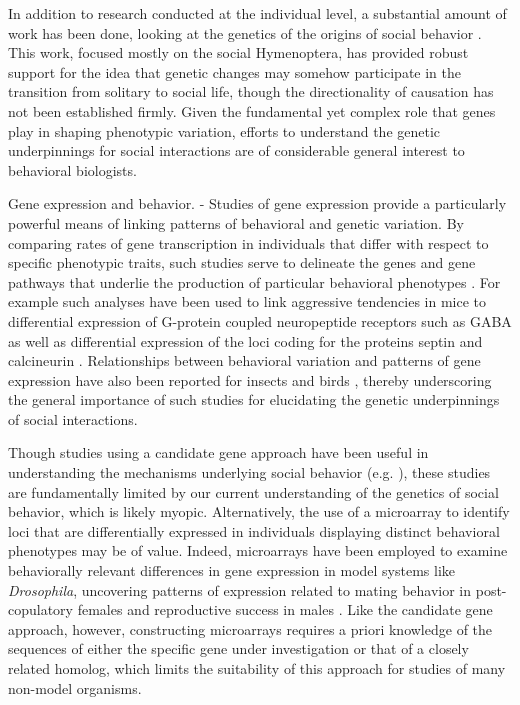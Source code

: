 \documentclass[10.5pt]{article}
\begin{document}
In addition to research conducted at the individual level, a substantial amount of work has been done, looking at the genetics of the origins of social behavior \citep{Robinson:2008gq,Toth:2010fr}. This work, focused mostly on the social Hymenoptera, has provided robust support for the idea that genetic changes may somehow participate in the transition from solitary to social life, though the directionality of causation has not been established firmly. Given the fundamental yet complex role that genes play in shaping phenotypic variation, efforts to understand the genetic underpinnings for social interactions are of considerable general interest to behavioral biologists.

Gene expression and behavior. - Studies of gene expression provide a particularly powerful means of linking patterns of behavioral and genetic variation. By comparing rates of gene transcription in individuals that differ with respect to specific phenotypic traits, such studies serve to delineate the genes and gene pathways that underlie the production of particular behavioral phenotypes \citep{Burmeister:2005jw, Mukai:2009cr}. For example such analyses have been used to link aggressive tendencies in mice to differential expression of G-protein coupled neuropeptide receptors such as GABA \citep{SustkovaFiserova:2009um} as well as differential expression of the loci coding for the proteins septin \citep{Suzuki:2009hf} and calcineurin \citep{Miyakawa:2003gw}. Relationships between behavioral variation and patterns of gene expression have also been reported for insects \citep{Toth:2007cr, Dottorini:2007bc} and birds \citep{Mukai:2009cr, Lovell:2008jz, Wacker:2010gg}, thereby underscoring the general importance of such studies for elucidating the genetic underpinnings of social interactions. 

Though studies using a candidate gene approach have been useful in understanding the mechanisms underlying social behavior (e.g. \citep{Fitzpatrick:2005vd}), these studies are fundamentally limited by our current understanding of the genetics of social behavior, which is likely myopic.   Alternatively, the use of a microarray to identify loci that are differentially expressed in individuals displaying distinct behavioral phenotypes may be of value. Indeed, microarrays have been employed to examine behaviorally relevant differences in gene expression in model systems like \textit{Drosophila}, uncovering patterns of expression related to mating behavior in post-copulatory females \citep{Mack:2006cn, McGraw:2004hg} and reproductive success in males \citep{Drnevich:2004dj}.  Like the candidate gene approach, however, constructing microarrays requires a priori knowledge of the sequences of either the specific gene under investigation \citep{Mortazavi:2008jj} or that of a closely related homolog, which limits the suitability of this approach for studies of many non-model organisms. 
\end{document}
